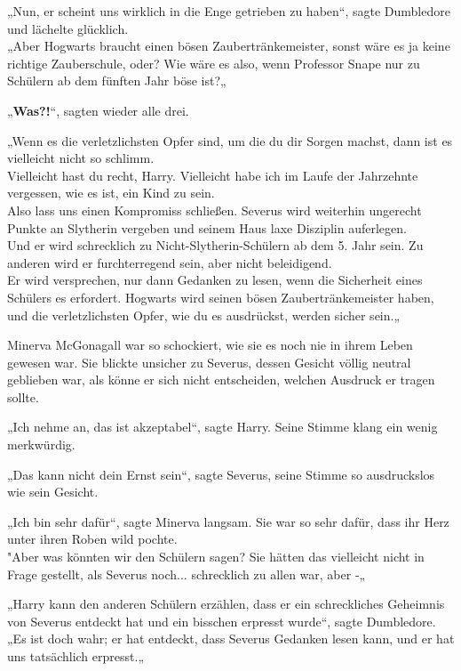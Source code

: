 {„Nun, er scheint uns wirklich in die Enge getrieben zu haben“, sagte Dumbledore und lächelte glücklich.\\ „Aber Hogwarts braucht einen bösen Zaubertränkemeister, sonst wäre es ja keine richtige Zauberschule, oder? Wie wäre es also, wenn Professor Snape nur zu Schülern ab dem fünften Jahr böse ist?„

„\textbf{Was?!}“, sagten wieder alle drei.

„Wenn es die verletzlichsten Opfer sind, um die du dir Sorgen machst, dann ist es vielleicht nicht so schlimm.\\ Vielleicht hast du recht, Harry. Vielleicht habe ich im Laufe der Jahrzehnte vergessen, wie es ist, ein Kind zu sein.\\ Also lass uns einen Kompromiss schließen. Severus wird weiterhin ungerecht Punkte an Slytherin vergeben und seinem Haus laxe Disziplin auferlegen.\\ Und er wird schrecklich zu Nicht-Slytherin-Schülern ab dem 5. Jahr sein. Zu anderen wird er furchterregend sein, aber nicht beleidigend.\\ Er wird versprechen, nur dann Gedanken zu lesen, wenn die Sicherheit eines Schülers es erfordert. Hogwarts wird seinen bösen Zaubertränkemeister haben, und die verletzlichsten Opfer, wie du es ausdrückst, werden sicher sein.„

Minerva McGonagall war so schockiert, wie sie es noch nie in ihrem Leben gewesen war. Sie blickte unsicher zu Severus, dessen Gesicht völlig neutral geblieben war, als könne er sich nicht entscheiden, welchen Ausdruck er tragen sollte.

„Ich nehme an, das ist akzeptabel“, sagte Harry. Seine Stimme klang ein wenig merkwürdig.

„Das kann nicht dein Ernst sein“, sagte Severus, seine Stimme so ausdruckslos wie sein Gesicht.

„Ich bin sehr dafür“, sagte Minerva langsam. Sie war so sehr dafür, dass ihr Herz unter ihren Roben wild pochte.\\ "Aber was könnten wir den Schülern sagen? Sie hätten das vielleicht nicht in Frage gestellt, als Severus noch... schrecklich zu allen war, aber -„

„Harry kann den anderen Schülern erzählen, dass er ein schreckliches Geheimnis von Severus entdeckt hat und ein bisschen erpresst wurde“, sagte Dumbledore.\\ „Es ist doch wahr; er hat entdeckt, dass Severus Gedanken lesen kann, und er hat uns tatsächlich erpresst.„

}
